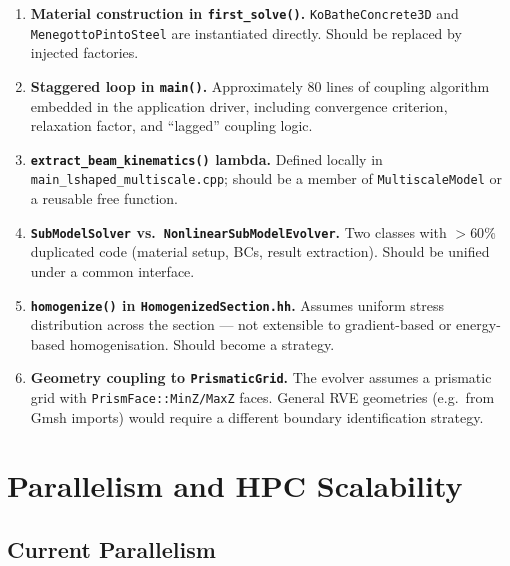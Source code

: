 \begin{enumerate}
  \item \textbf{Material construction in \texttt{first\_solve()}.}
    \texttt{KoBatheConcrete3D} and \texttt{MenegottoPintoSteel} are
    instantiated directly.  Should be replaced by injected factories.

  \item \textbf{Staggered loop in \texttt{main()}.}
    Approximately 80 lines of coupling algorithm embedded in the
    application driver, including convergence criterion, relaxation
    factor, and ``lagged'' coupling logic.

  \item \textbf{\texttt{extract\_beam\_kinematics()} lambda.}
    Defined locally in \texttt{main\_lshaped\_multiscale.cpp}; should
    be a member of \texttt{MultiscaleModel} or a reusable free
    function.

  \item \textbf{\texttt{SubModelSolver} vs.\
    \texttt{NonlinearSubModelEvolver}.}
    Two classes with $>60\%$ duplicated code (material setup,
    BCs, result extraction).  Should be unified under a common
    interface.

  \item \textbf{\texttt{homogenize()} in
    \texttt{HomogenizedSection.hh}.}
    Assumes uniform stress distribution across the section ---
    not extensible to gradient-based or energy-based
    homogenisation.  Should become a strategy.

  \item \textbf{Geometry coupling to \texttt{PrismaticGrid}.}
    The evolver assumes a prismatic grid with
    \texttt{PrismFace::MinZ/MaxZ} faces.  General RVE geometries
    (e.g.\ from Gmsh imports) would require a different boundary
    identification strategy.
\end{enumerate}


\section{Parallelism and HPC Scalability}
\label{sec:ms-hpc}

\subsection{Current Parallelism}


